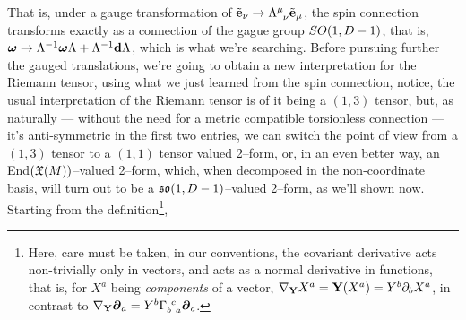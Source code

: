 That is, under a gauge transformation of $\tilde{\vb e}_\nu\rightarrow\tensor{\Lambda}{^\mu_\nu}\tilde{\vb e}_\mu$, the spin connection transforms exactly as a connection of the gague group $SO\qty(1,D-1)$, that is, 
$\boldsymbol \omega\rightarrow \Lambda^{-1}\boldsymbol\omega\Lambda+\Lambda^{-1}\vb d{\Lambda}$, which is what we're searching. Before pursuing further the gauged translations, we're going to obtain a new interpretation 
for the Riemann tensor, using what we just learned from the spin connection, notice, the usual interpretation of the Riemann tensor is of it being a $(1,3)$ tensor, but, as naturally --- without the need for a metric compatible 
torsionless connection --- it's anti-symmetric in the first two entries, we can switch the point of view from a $(1,3)$ tensor to a $(1,1)$ tensor valued 2--form, or, in an even better way, an End$\qty(\mathfrak X\qty(M))$--valued 2--form, 
which, when decomposed in the non-coordinate basis, will turn out to be a $\mathfrak{so}\qty(1,D-1)$--valued 2--form, as we'll shown now. Starting from the definition\footnote{Here, care must be taken, in our conventions, the covariant derivative acts non-trivially only 
in vectors, and acts as a normal derivative in functions, that is, for $X^a$ being \textit{components} of a vector, $\nabla_{\vb Y}X^a=\vb Y\qty(X^a)=Y^b\partial_b X^a$, in contrast to $\nabla_{\vb Y}\boldsymbol\partial_a=Y^b\tensor{\Gamma}{_b^c_a}\boldsymbol\partial_c$.},
